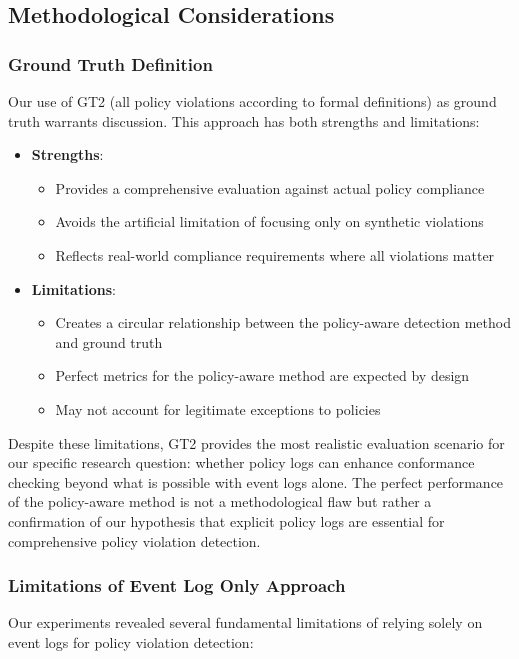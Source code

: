 \subsection{Methodological Considerations}

\subsubsection{Ground Truth Definition}
Our use of GT2 (all policy violations according to formal definitions) as ground truth warrants discussion. This approach has both strengths and limitations:

\begin{itemize}
    \item \textbf{Strengths}:
    \begin{itemize}
        \item Provides a comprehensive evaluation against actual policy compliance
        \item Avoids the artificial limitation of focusing only on synthetic violations
        \item Reflects real-world compliance requirements where all violations matter
    \end{itemize}
    
    \item \textbf{Limitations}:
    \begin{itemize}
        \item Creates a circular relationship between the policy-aware detection method and ground truth
        \item Perfect metrics for the policy-aware method are expected by design
        \item May not account for legitimate exceptions to policies
    \end{itemize}
\end{itemize}

Despite these limitations, GT2 provides the most realistic evaluation scenario for our specific research question: whether policy logs can enhance conformance checking beyond what is possible with event logs alone. The perfect performance of the policy-aware method is not a methodological flaw but rather a confirmation of our hypothesis that explicit policy logs are essential for comprehensive policy violation detection.

\subsubsection{Limitations of Event Log Only Approach}
Our experiments revealed several fundamental limitations of relying solely on event logs for policy violation detection:

